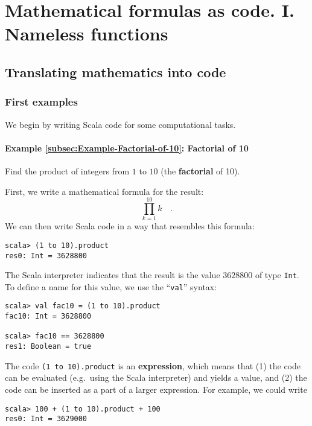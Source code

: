 
\chapter{Mathematical formulas as code. I. Nameless functions\label{chap:1-Values,-types,-expressions,}}

\section{Translating mathematics into code}

\subsection{First examples}

We begin by writing Scala code for some computational tasks.

\subsubsection{Example \label{subsec:Example-Factorial-of-10}\ref{subsec:Example-Factorial-of-10}:
Factorial of 10}

Find the product of integers from $1$ to $10$ (the \textbf{factorial}
of 10).

First, we write a mathematical formula for the result:
\[
\prod_{k=1}^{10}k\quad.
\]
We can then write Scala code in a way that resembles this formula:
\begin{lstlisting}
scala> (1 to 10).product
res0: Int = 3628800
\end{lstlisting}

The Scala interpreter indicates that the result is the value $3628800$
of type \lstinline!Int!. To define a name for this value, we use
the ``\lstinline!val!'' syntax:
\begin{lstlisting}
scala> val fac10 = (1 to 10).product
fac10: Int = 3628800

scala> fac10 == 3628800
res1: Boolean = true
\end{lstlisting}

The code \texttt{}\lstinline!(1 to 10).product! is an \textbf{expression},
which means that (1) the code can be evaluated (e.g.~using the Scala
interpreter) and yields a value, and (2) the code can be inserted
as a part of a larger expression. For example, we could write
\begin{lstlisting}
scala> 100 + (1 to 10).product + 100
res0: Int = 3629000
\end{lstlisting}


